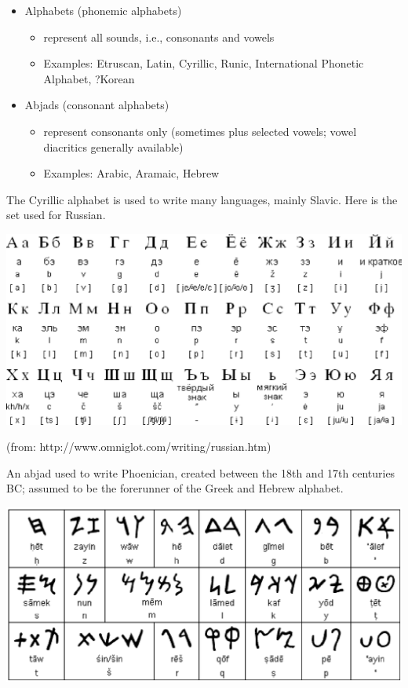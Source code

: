 \documentclass[a4paper,landscape,headrule,footrule,xetex]{foils}
\begin{document}
\begin{itemize}
\item Alphabets (phonemic alphabets)
\begin{itemize}
\item represent all sounds, i.e., consonants and vowels
\item Examples: Etruscan, Latin, Cyrillic, Runic, International Phonetic Alphabet, ?Korean 
\end{itemize}

\item Abjads (consonant alphabets)
\begin{itemize}
\item represent consonants only (sometimes plus selected vowels; vowel diacritics generally available)
\item Examples: Arabic, Aramaic, Hebrew
\end{itemize}
\end{itemize}






The Cyrillic alphabet is used to write many languages, mainly Slavic.
Here is the set used for Russian.

\includegraphics{../pics/russian.eps}




(from: http://www.omniglot.com/writing/russian.htm)



An abjad used to write Phoenician, created between the 18th and 17th
centuries BC; assumed to be the forerunner of the Greek and Hebrew
alphabet.




\includegraphics{../pics/phonecian.eps}
\end{document}
